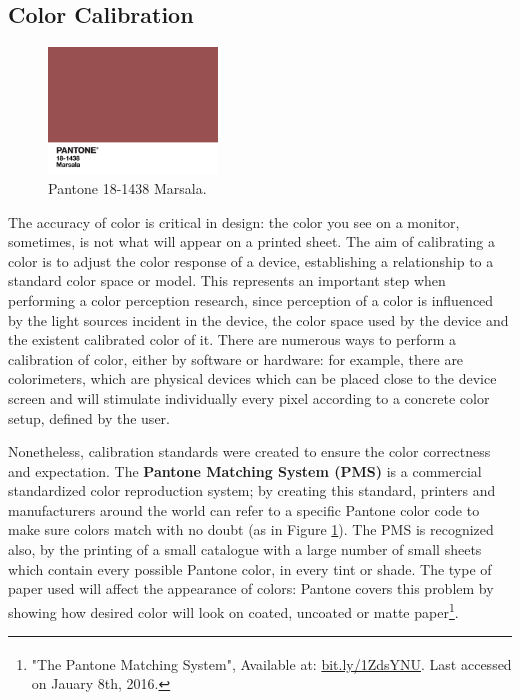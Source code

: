 \documentclass{report}
\begin{document}
\subsection{Color Calibration}
%
\begin{figure}
	\centering
    \vspace{-\baselineskip}
    \includegraphics[width=0.4\textwidth]{Pantone_Marsala.jpg}
    \caption[Pantone Matching System - Marsala]{Pantone 18-1438 Marsala.\protect\footnotemark[21]}
    \label{fig:pantone}
\end{figure}
%
The accuracy of color is critical in design: the color you see on a monitor, sometimes, is not what will appear on a printed sheet. The aim of calibrating a color is to adjust the color response of a device, establishing
a relationship to a standard color space or model. This represents an important step when performing a
color perception research, since perception of a color is influenced by the light sources incident in the
device, the color space used by the device and the existent calibrated color of it. There are numerous
ways to perform a calibration of color, either by software or hardware: for example, there are colorimeters, which
are physical devices which can be placed close to the device screen and will stimulate individually every pixel
according to a concrete color setup, defined by the user. \par
Nonetheless, calibration standards were created to ensure the color correctness and expectation. The
\textbf{Pantone Matching System (PMS)} is a commercial standardized color reproduction system; by creating
this standard, printers and manufacturers around the world can refer to a specific Pantone color code to
make sure colors match with no doubt (as in Figure \ref{fig:pantone}). The PMS is recognized also, by the printing of a small catalogue with
a large number of small sheets which contain every possible Pantone color, in every tint or shade. The type
of paper used will affect the appearance of colors: Pantone covers this problem by showing how desired
color will look on coated, uncoated or matte paper\footnote{"The Pantone Matching System\textsuperscript{\textregistered}",
Available at: \url {bit.ly/1ZdsYNU}. Last accessed on Jauary 8th, 2016.}.
\end{document}
